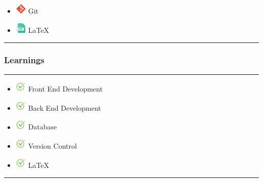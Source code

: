 \documentclass[14pt]{beamer}
\begin{document}
\begin{frame}
\begin{itemize}
        \item [] \includegraphics[width=0.2in, height=0.2in]{./Codiac/logos/git.png} Git \\
            
        \item [] \includegraphics[width=0.2in, height=0.2in]{./Codiac/logos/latex.png} LaTeX \\
    \end{itemize}
\noindent
    {\color{pink} \rule{\linewidth}{0.7mm} }
\end{frame}

\begin{frame}
    \frametitle{Learnings}
    \noindent
    {\color{pink} \rule{\linewidth}{0.7mm} }
    \begin{itemize}
    \item [] \includegraphics[width=0.2in, height=0.2in]{./Codiac/logos/check.png} Front End Development \\
        
    \item [] \includegraphics[width=0.2in, height=0.2in]{./Codiac/logos/check.png} Back End Development \\
        
    \item [] \includegraphics[width=0.2in, height=0.2in]{./Codiac/logos/check.png} Database\\
        
   \item [] \includegraphics[width=0.2in, height=0.2in]{./Codiac/logos/check.png} Version Control \\

   \item [] \includegraphics[width=0.2in, height=0.2in]{./Codiac/logos/check.png} LaTeX \\
  
\end{itemize}
\noindent
    {\color{pink} \rule{\linewidth}{0.7mm} }
\end{frame}
\end{document}
